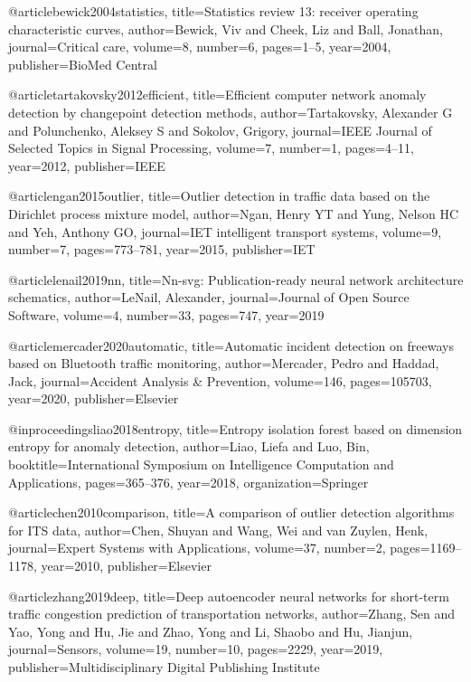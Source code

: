 @article{bewick2004statistics,
  title={Statistics review 13: receiver operating characteristic curves},
  author={Bewick, Viv and Cheek, Liz and Ball, Jonathan},
  journal={Critical care},
  volume={8},
  number={6},
  pages={1--5},
  year={2004},
  publisher={BioMed Central}
}

@article{tartakovsky2012efficient,
  title={Efficient computer network anomaly detection by changepoint detection methods},
  author={Tartakovsky, Alexander G and Polunchenko, Aleksey S and Sokolov, Grigory},
  journal={IEEE Journal of Selected Topics in Signal Processing},
  volume={7},
  number={1},
  pages={4--11},
  year={2012},
  publisher={IEEE}
}

@article{ngan2015outlier,
  title={Outlier detection in traffic data based on the Dirichlet process mixture model},
  author={Ngan, Henry YT and Yung, Nelson HC and Yeh, Anthony GO},
  journal={IET intelligent transport systems},
  volume={9},
  number={7},
  pages={773--781},
  year={2015},
  publisher={IET}
}

@article{lenail2019nn,
  title={Nn-svg: Publication-ready neural network architecture schematics},
  author={LeNail, Alexander},
  journal={Journal of Open Source Software},
  volume={4},
  number={33},
  pages={747},
  year={2019}
}

@article{mercader2020automatic,
  title={Automatic incident detection on freeways based on Bluetooth traffic monitoring},
  author={Mercader, Pedro and Haddad, Jack},
  journal={Accident Analysis \& Prevention},
  volume={146},
  pages={105703},
  year={2020},
  publisher={Elsevier}
}

@inproceedings{liao2018entropy,
  title={Entropy isolation forest based on dimension entropy for anomaly detection},
  author={Liao, Liefa and Luo, Bin},
  booktitle={International Symposium on Intelligence Computation and Applications},
  pages={365--376},
  year={2018},
  organization={Springer}
}

@article{chen2010comparison,
  title={A comparison of outlier detection algorithms for ITS data},
  author={Chen, Shuyan and Wang, Wei and van Zuylen, Henk},
  journal={Expert Systems with Applications},
  volume={37},
  number={2},
  pages={1169--1178},
  year={2010},
  publisher={Elsevier}
}

@article{zhang2019deep,
  title={Deep autoencoder neural networks for short-term traffic congestion prediction of transportation networks},
  author={Zhang, Sen and Yao, Yong and Hu, Jie and Zhao, Yong and Li, Shaobo and Hu, Jianjun},
  journal={Sensors},
  volume={19},
  number={10},
  pages={2229},
  year={2019},
  publisher={Multidisciplinary Digital Publishing Institute}
}

